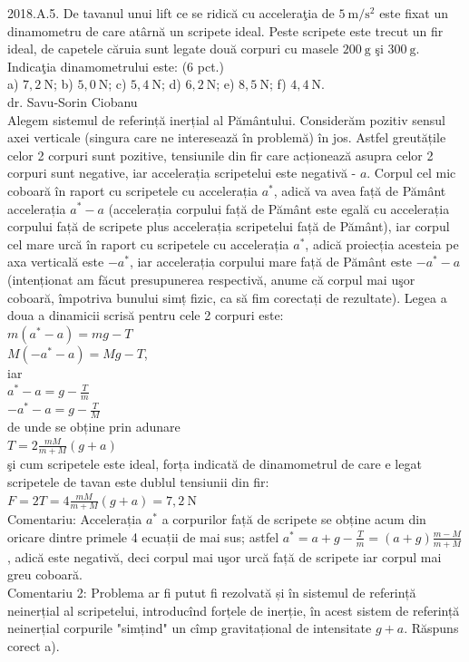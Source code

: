 2018.A.5. De tavanul unui lift ce se ridică cu acceleraţia de $5 \mathrm{~m} / \mathrm{s}^{2}$ este fixat un dinamometru de care atârnă un scripete ideal. Peste scripete este trecut un fir ideal, de capetele căruia sunt legate două corpuri cu masele $200 \mathrm{~g}$ şi $300 \mathrm{~g}$. Indicaţia dinamometrului este: (6 pct.)\\ a) $7,2 \mathrm{~N}$; b) $5,0 \mathrm{~N}$; c) $5,4 \mathrm{~N}$; d) $6,2 \mathrm{~N}$; e) $8,5 \mathrm{~N}$; f) $4,4 \mathrm{~N}$.\\ dr. Savu-Sorin Ciobanu\\ Alegem sistemul de referință inerțial al Pământului. Considerăm pozitiv sensul axei verticale (singura care ne interesează în problemă) în jos. Astfel greutățile celor 2 corpuri sunt pozitive, tensiunile din fir care acționează asupra celor 2 corpuri sunt negative, iar accelerația scripetelui este negativă - $a$. Corpul cel mic coboară în raport cu scripetele cu accelerația $a^{*}$, adică va avea față de Pământ accelerația $a^{*}-a$ (accelerația corpului față de Pământ este egală cu accelerația corpului față de scripete plus accelerația scripetelui față de Pământ), iar corpul cel mare urcă în raport cu scripetele cu accelerația $a^{*}$, adică proiecția acesteia pe axa verticală este $-a^{*}$, iar accelerația corpului mare față de Pământ este $-a^{*}-a$ (intenționat am făcut presupunerea respectivă, anume că corpul mai uşor coboară, împotriva bunului simț fizic, ca să fim corectați de rezultate). Legea a doua a dinamicii scrisă pentru cele 2 corpuri este:\\ $m\left(a^{*}-a\right)=m g-T$\\ $M\left(-a^{*}-a\right)=M g-T$,\\ iar\\ $a^{*}-a=g-\frac{T}{m}$\\ $-a^{*}-a=g-\frac{T}{M}$\\ de unde se obține prin adunare\\ $T=2 \frac{m M}{m+M}(g+a)$\\ şi cum scripetele este ideal, forța indicată de dinamometrul de care e legat scripetele de tavan este dublul tensiunii din fir:\\ $F=2 T=4 \frac{m M}{m+M}(g+a)=7,2 \mathrm{~N}$\\ Comentariu: Accelerația $a^{*}$ a corpurilor față de scripete se obține acum din oricare dintre primele 4 ecuații de mai sus; astfel $a^{*}=a+g-\frac{T}{m}=(a+g) \frac{m-M}{m+M}$, adică este negativă, deci corpul mai uşor urcă față de scripete iar corpul mai greu coboară.\\ Comentariu 2: Problema ar fi putut fi rezolvată și în sistemul de referință neinerțial al scripetelui, introducînd forțele de inerție, în acest sistem de referință neinerțial corpurile "simțind" un cîmp gravitațional de intensitate $g+a$. Răspuns corect a).\\

